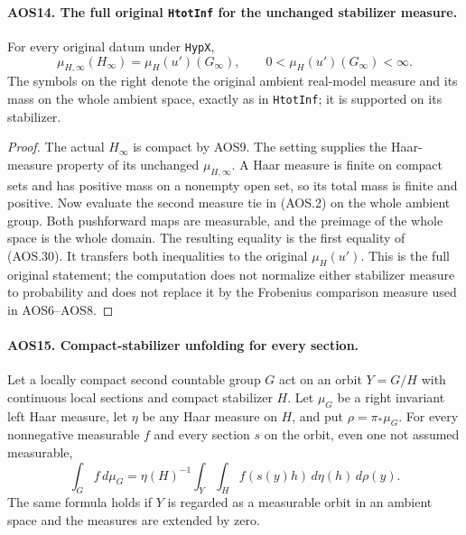 \paragraph{AOS14. The full original \texttt{HtotInf} for the unchanged stabilizer measure.}
\label{claim:AOS14}
For every original datum under \texttt{HypX},
\[
         \mu_{H,\infty}(H_\infty)=\mu_H(u')(G_\infty),
             \qquad 0<\mu_H(u')(G_\infty)<\infty.
 \tag{AOS.30}
\]
The symbols on the right denote the original ambient real-model
measure and its mass on the whole ambient space, exactly as in
\texttt{HtotInf}; it is supported on its stabilizer.

\begin{proof}
The actual $H_\infty$ is compact by AOS9.  The setting supplies
the Haar-measure property of its unchanged $\mu_{H,\infty}$.
A Haar measure is finite on compact sets and has positive mass
on a nonempty open set, so its total mass is finite and positive.
Now evaluate the second measure tie in (AOS.2) on the whole ambient
group.  Both pushforward maps are measurable, and the preimage of
the whole space is the whole domain.  The resulting equality is
the first equality of (AOS.30).  It transfers both inequalities to
the original $\mu_H(u')$.  This is the full original statement;
the computation does not normalize either stabilizer measure to
probability and does not replace it by the Frobenius comparison
measure used in AOS6--AOS8.
\end{proof}

\paragraph{AOS15. Compact-stabilizer unfolding for every section.}
\label{claim:AOS15}
Let a locally compact second countable group $G$ act on an orbit
$Y=G/H$ with continuous local sections and compact stabilizer $H$.
Let $\mu_G$ be a right invariant left Haar measure, let $\eta$ be
any Haar measure on $H$, and put $\rho=\pi_*\mu_G$.
For every nonnegative measurable $f$ and every section $s$ on the
orbit, even one not assumed measurable,
\[
       \int_G f\,d\mu_G
        =\eta(H)^{-1}
           \int_Y\int_H f(s(y)h)\,d\eta(h)\,d\rho(y).
 \tag{AOS.31}
\]
The same formula holds if $Y$ is regarded as a measurable orbit in
an ambient space and the measures are extended by zero.

